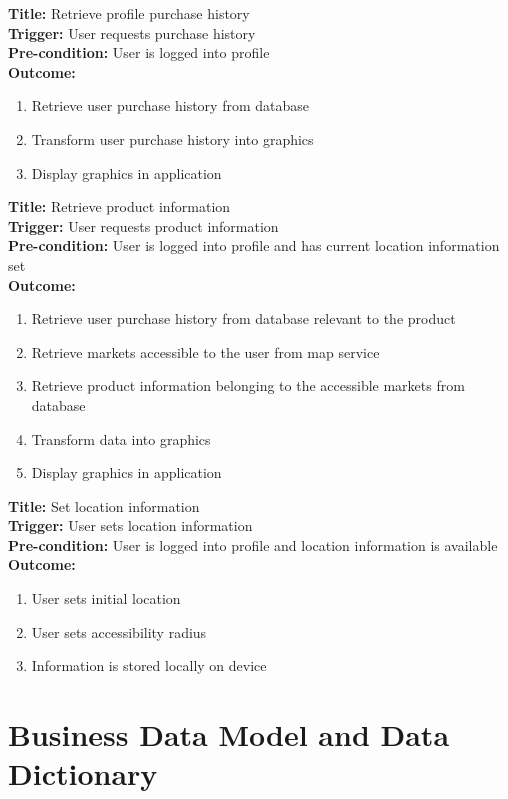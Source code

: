 \documentclass[12pt]{article}
\begin{document}
\textbf{Title:} Retrieve profile purchase history \\
\textbf{Trigger:} User requests purchase history\\
\textbf{Pre-condition:} User is logged into profile\\
\textbf{Outcome: } 
\begin{enumerate}
    \item Retrieve user purchase history from database
    \item Transform user purchase history into graphics
    \item Display graphics in application
\end{enumerate}
\textbf{Title:} Retrieve product information \\
\textbf{Trigger:} User requests product information\\
\textbf{Pre-condition:} User is logged into profile and has current location information set \\
\textbf{Outcome: } 
\begin{enumerate}
    \item Retrieve user purchase history from database relevant to the product
    \item Retrieve markets accessible to the user from map service
    \item Retrieve product information belonging to the accessible markets from database
    \item Transform data into graphics
    \item Display graphics in application
\end{enumerate}
\textbf{Title:} Set location information \\
\textbf{Trigger:} User sets location information \\
\textbf{Pre-condition:} User is logged into profile and location information is available \\
\textbf{Outcome: } 
\begin{enumerate}
    \item User sets initial location
    \item User sets accessibility radius
    \item Information is stored locally on device
\end{enumerate}

\section{Business Data Model and Data Dictionary}
\end{document}
